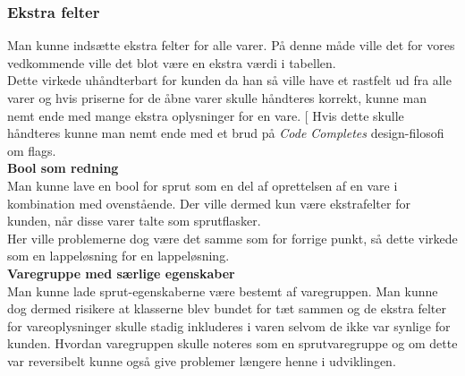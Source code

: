 \documentclass[]{article}
\begin{document}
\subsubsection{Ekstra felter}
Man kunne indsætte ekstra felter for alle varer. På denne måde ville det for vores vedkommende ville det blot være en ekstra værdi i tabellen. \\ 
\indent Dette virkede uhåndterbart for kunden da han så ville have et rastfelt ud fra alle varer og hvis priserne for de åbne varer skulle håndteres korrekt, kunne man nemt ende med mange ekstra oplysninger for en vare. [\cite{boswell2011art} Hvis dette skulle håndteres kunne man nemt ende med et brud på \textit{Code Completes} design-filosofi om flags.\\
\indent \textbf{Bool som redning}\\
Man kunne lave en bool for sprut som en del af oprettelsen af en vare i kombination med ovenstående. Der ville dermed kun være ekstrafelter for kunden, når disse varer talte som sprutflasker.\\
\indent Her ville problemerne dog være det samme som for forrige punkt, så dette virkede som en lappeløsning for en lappeløsning.\\
\indent \textbf{Varegruppe med særlige egenskaber}\\
Man kunne lade sprut-egenskaberne være bestemt af varegruppen. Man kunne dog dermed risikere at klasserne blev bundet for tæt sammen og de ekstra felter for vareoplysninger skulle stadig inkluderes i varen selvom de ikke var synlige for kunden. Hvordan varegruppen skulle noteres som en sprutvaregruppe og om dette var reversibelt kunne også give problemer længere henne i udviklingen.
\end{document}
